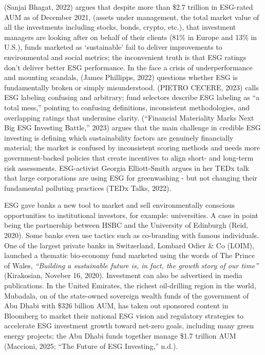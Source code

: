 \documentclass[
  12pt,
  letterpaper,
  DIV=11,
  numbers=noendperiod]{scrartcl}
\begin{document}
(Sanjai Bhagat, 2022) argues that despite more than \$2.7 trillion in
ESG-rated AUM as of December 2021, (assets under management, the total
market value of all the investments including stocks, bonds, crypto,
etc.), that investment managers are looking after on behalf of their
clients (81\% in Europe and 13\% in U.S.), funds marketed as
`sustainable' fail to deliver improvements to environmental and social
metrics; the inconvenient truth is that ESG ratings don't deliver better
ESG performance. In the face a crisis of underperformance and mounting
scandals, (James Phillipps, 2022) questions whether ESG is fundamentally
broken or simply misunderstood. (PIETRO CECERE, 2023) calls ESG labeling
confusing and arbitrary; fund selectors describe ESG labeling as ``a
total mess,'' pointing to confusing definitions, inconsistent
methodologies, and overlapping ratings that undermine clarity.
({``Financial {Materiality Marks Next Big ESG Investing Battle},''}
2023) argues that the main challenge in credible ESG investing is
defining which sustainability factors are genuinely financially
material; the market is confused by inconsistent scoring methods and
needs more government-backed policies that create incentives to align
short- and long-term risk assessments. ESG-activist Georgia
Elliott-Smith argues in her TEDx talk that large corporations are using
ESG for greenwashing - but not changing their fundamental polluting
practices (TEDx Talks, 2022).

ESG gave banks a new tool to market and sell environmentally conscious
opportunities to institutional investors, for example: universities. A
case in point being the partnership between HSBC and the University of
Edinburgh (Reid, 2020). Some banks even use tactics such as co-branding
with famous individuals. One of the largest private banks in
Switzerland, Lombard Odier \& Co (LOIM), launched a thematic bio-economy
fund marketed using the words of The Prince of Wales, \emph{``Building a
sustainable future is, in fact, the growth story of our time''}
(Kirakosian, Noveber 16, 2020). Investment can also be advertised in
media publications. In the United Emirates, the richest oil-drilling
region in the world, Mubadala, on of the state-owned sovereign wealth
funds of the government of Abu Dhabi with \$326 billion AUM, has taken
out sponsored content in Bloomberg to market their national ESG vision
and regulatory strategies to accelerate ESG investment growth toward
net-zero goals, including many green energy projects; the Abu Dhabi
funds together manage \$1.7 trillion AUM (Maccioni, 2025; {``The
{Future} of {ESG Investing},''} n.d.).
\end{document}
